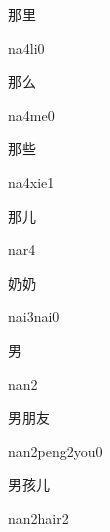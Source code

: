 \begin{multicols*}{2}
\begin{verbete}[na4li0]{那里}
\begin{pronuncia}{na4li0}
\end{pronuncia}
\end{verbete}

\begin{verbete}[na4me0]{那么}
\begin{pronuncia}{na4me0}
\end{pronuncia}
\end{verbete}

\begin{verbete}[na4xie1]{那些}
\begin{pronuncia}{na4xie1}
\end{pronuncia}
\end{verbete}

\begin{verbete}[nar4]{那儿}
\begin{pronuncia}{nar4}
\end{pronuncia}
\end{verbete}

\begin{verbete}{奶奶}
\begin{pronuncia}{nai3nai0}
\end{pronuncia}
\end{verbete}

\begin{verbete}[nan2]{男}
\begin{pronuncia}{nan2}
\end{pronuncia}
\end{verbete}

\begin{verbete}{男朋友}
\begin{pronuncia}{nan2peng2you0}
\end{pronuncia}
\end{verbete}

\begin{verbete}{男孩儿}
\begin{pronuncia}{nan2hair2}
\end{pronuncia}
\end{verbete}


\end{multicols*}
